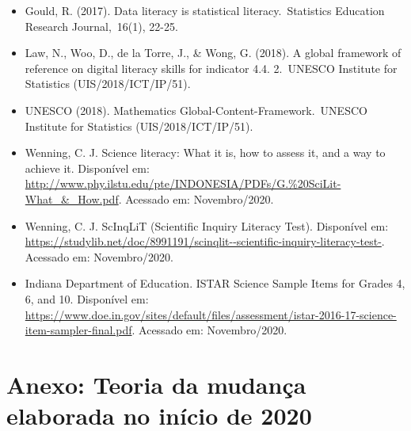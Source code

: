 \documentclass[
]{book}
\providecommand{\tightlist}{%
  \setlength{\itemsep}{0pt}\setlength{\parskip}{0pt}}
\begin{document}
\begin{itemize}
\tightlist
\item
  Gould, R. (2017). Data literacy is statistical literacy.~Statistics Education Research Journal,~16(1), 22-25.
\item
  Law, N., Woo, D., de la Torre, J., \& Wong, G. (2018). A global framework of reference on digital literacy skills for indicator 4.4. 2.~UNESCO Institute for Statistics (UIS/2018/ICT/IP/51).
\item
  UNESCO (2018). Mathematics Global-Content-Framework.~UNESCO Institute for Statistics (UIS/2018/ICT/IP/51).
\item
  Wenning, C. J. Science literacy: What it is, how to assess it, and a way to achieve it. Disponível em: \url{http://www.phy.ilstu.edu/pte/INDONESIA/PDFs/G.\%20SciLit-What_\&_How.pdf}. Acessado em: Novembro/2020.
\item
  Wenning, C. J. ScInqLiT (Scientific Inquiry Literacy Test). Disponível em: \url{https://studylib.net/doc/8991191/scinqlit--scientific-inquiry-literacy-test-}. Acessado em: Novembro/2020.
\item
  Indiana Department of Education. ISTAR Science Sample Items for Grades 4, 6, and 10. Disponível em: \url{https://www.doe.in.gov/sites/default/files/assessment/istar-2016-17-science-item-sampler-final.pdf}. Acessado em: Novembro/2020.
\end{itemize}

\hypertarget{anexo-teoria-da-mudanuxe7a-elaborada-no-inuxedcio-de-2020}{%
\section*{Anexo: Teoria da mudança elaborada no início de 2020}\label{anexo-teoria-da-mudanuxe7a-elaborada-no-inuxedcio-de-2020}}
\end{document}
